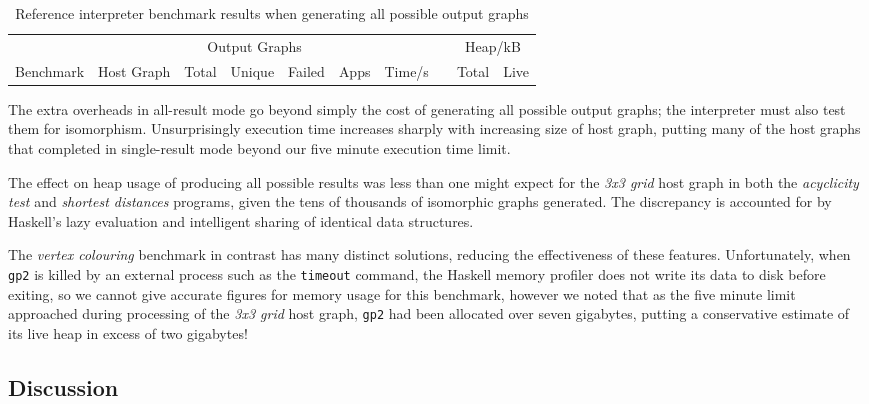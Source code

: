 \begin{table}[h]
\begin{minipage}{\textwidth}
\centering

\begin{tabular}{llrrrrrcrr}
\hline 
&  & \multicolumn{3}{c}{Output Graphs} & & && \multicolumn{2}{c}{Heap/kB}\\
Benchmark          & Host Graph & Total & Unique   & Failed & Apps & Time/s   & & Total  & Live \\
\hline 

\end{tabular}

\caption[Reference interpreter benchmarks]{Reference interpreter benchmark results when generating all possible output graphs}

\label{table:resultsAll}
\end{minipage}
\end{table}

The extra overheads in all-result mode go beyond simply the cost of generating all possible output graphs; the interpreter must also test them for isomorphism. Unsurprisingly execution time increases sharply with increasing size of host graph, putting many of the host graphs that completed in single-result mode beyond our five minute execution time limit.

The effect on heap usage of producing all possible results was less than one might expect for the \textit{3x3 grid} host graph in both the \textit{acyclicity test} and \textit{shortest distances} programs, given the tens of thousands of isomorphic graphs generated. The discrepancy is accounted for by Haskell's lazy evaluation and intelligent sharing of identical data structures.

The \textit{vertex colouring} benchmark in contrast has many distinct solutions, reducing the effectiveness of these features. Unfortunately, when \texttt{gp2} is killed by an external process such as the \texttt{timeout} command, the Haskell memory profiler does not write its data to disk before exiting, so we cannot give accurate figures for memory usage for this benchmark, however we noted that as the five minute limit approached during processing of the \textit{3x3 grid} host graph, \texttt{gp2} had been allocated over seven gigabytes, putting a conservative estimate of its live heap in excess of two gigabytes!


\subsection{Discussion}

